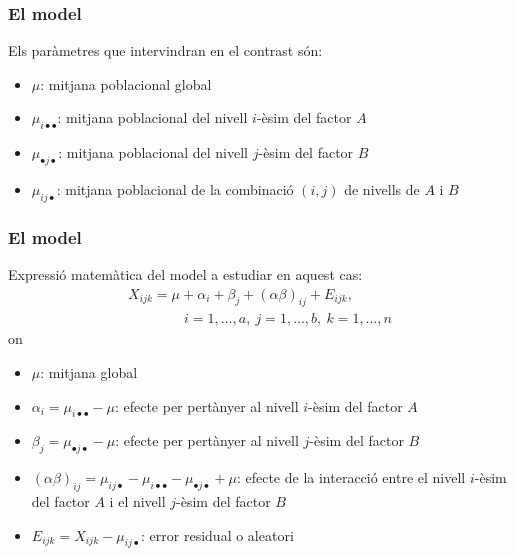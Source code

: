 \documentclass[12pt,t]{beamer}
\renewcommand{\emph}[1]{{\color{red}#1}}
\theoremstyle{plain}
\theoremstyle{definition}
\begin{document}
\begin{frame}
\frametitle{El model}
Els paràmetres que intervindran en el contrast són:
\medskip

\begin{itemize}
\item $\mu$: mitjana poblacional global
\medskip

\item $\mu_{i\bullet\bullet}$: mitjana poblacional del nivell $i$-èsim del factor $A$
\medskip

\item $\mu_{\bullet j\bullet}$: mitjana poblacional del nivell  $j$-èsim  del
factor $B$
\medskip

\item $\mu_{ij\bullet}$: mitjana poblacional de la combinació $(i,j)$ de nivells de $A$ i $B$
\end{itemize}

\end{frame}



\begin{frame}
\frametitle{El model}
\vspace*{-1ex}

\emph{Expressió matemàtica} del model a estudiar en aquest cas:
$$
\begin{array}{l}
X_{ijk} = \mu + \alpha_i + \beta_j + (\alpha\beta)_{ij}+E_{ijk},\\
\qquad\qquad i=1,\ldots,a,\ j=1,\ldots,b,\ k=1,\ldots,n
\end{array}
$$
on
\begin{itemize}
\item $\mu$: mitjana global
\medskip

\item $\alpha_i =\mu_{i\bullet\bullet}-\mu$: efecte per pertànyer al nivell  $i$-èsim del factor $A$
\medskip

\item $\beta_j =\mu_{\bullet j\bullet}-\mu$: efecte per pertànyer al nivell  $j$-èsim del factor $B$
\medskip

\item $(\alpha\beta)_{ij}=\mu_{ij\bullet}-\mu_{i\bullet\bullet}-\mu_{\bullet
j\bullet}+\mu$: efecte de la interacció entre el  nivell $i$-èsim del factor $A$ i
el  nivell  $j$-èsim del factor $B$
\medskip

\item $E_{ijk}=X_{ijk}-\mu_{ij\bullet}$: error residual o aleatori
\end{itemize}
\end{frame}
\end{document}
